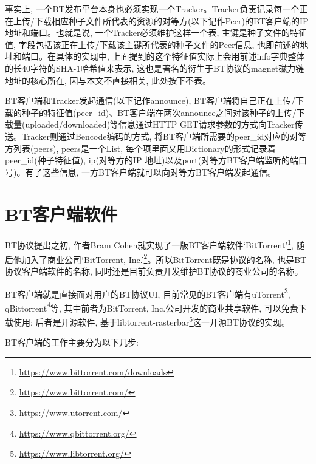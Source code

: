 事实上, 一个BT发布平台本身也必须实现一个Tracker。Tracker负责记录每一个正在上传/下载相应种子文件所代表的资源的对等方(以下记作Peer)的BT客户端的IP地址和端口。也就是说, 一个Tracker必须维护这样一个表, 主键是种子文件的特征值, 字段包括该正在上传/下载该主键所代表的种子文件的Peer信息, 也即前述的地址和端口。在具体的实现中, 上面提到的这个特征值实际上会用前述info字典整体的长40字符的SHA-1哈希值来表示, 这也是著名的衍生于BT协议的magnet磁力链地址\cite{greghazel2008bep0009}的核心所在, 因与本文不直接相关, 此处按下不表。

BT客户端和Tracker发起通信(以下记作announce), BT客户端将自己正在上传/下载的种子的特征值(peer\_id)、BT客户端在两次announce之间对该种子的上传/下载量(uploaded/downloaded)等信息通过HTTP GET请求参数的方式向Tracker传送。Tracker则通过Bencode编码的方式, 将BT客户端所需要的peer\_id对应的对等方列表(peers), peers是一个List, 每个项里面又用Dictionary的形式记录着peer\_id(种子特征值), ip(对等方的IP 地址)以及port(对等方BT客户端监听的端口号)。有了这些信息, 一方BT客户端就可以向对等方BT客户端发起通信。


\section{BT客户端软件}

BT协议提出之初, 作者Bram Cohen就实现了一版BT客户端软件`BitTorrent'\footnote{\url{https://www.bittorrent.com/downloads}}, 随后他加入了商业公司`BitTorrent, Inc.'\footnote{\url{https://www.bittorrent.com/}}。所以BitTorrent既是协议的名称, 也是BT协议客户端软件的名称, 同时还是目前负责开发维护BT协议的商业公司的名称。

BT客户端就是直接面对用户的BT协议UI, 目前常见的BT客户端有uTorrent\footnote{\url{https://www.utorrent.com/}}, qBittorrent\footnote{\url{https://www.qbittorrent.org/}}等, 其中前者为BitTorrent, Inc.公司开发的商业共享软件, 可以免费下载使用; 后者是开源软件, 基于libtorrent-rasterbar\footnote{\url{https://www.libtorrent.org/}}这一开源BT协议的实现。

BT客户端的工作主要分为以下几步:

